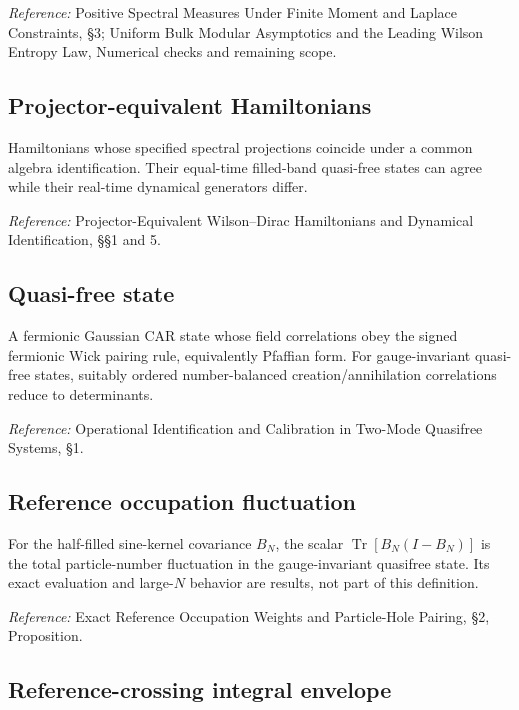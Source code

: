 \documentclass[
  10pt,
  a4paper,
]{article}
\begin{document}
\nopagebreak[4]

\emph{Reference:} Positive Spectral Measures Under Finite Moment and Laplace Constraints, §3; Uniform Bulk Modular Asymptotics and the Leading Wilson Entropy Law, Numerical checks and remaining scope.

\subsection{Projector-equivalent Hamiltonians}\label{projector-equivalent-hamiltonians}

Hamiltonians whose specified spectral projections coincide under a common algebra identification. Their equal-time filled-band quasi-free states can agree while their real-time dynamical generators differ.

\nopagebreak[4]

\emph{Reference:} Projector-Equivalent Wilson--Dirac Hamiltonians and Dynamical Identification, §§1 and 5.

\subsection{Quasi-free state}\label{quasi-free-state}

A fermionic Gaussian CAR state whose field correlations obey the signed fermionic Wick pairing rule, equivalently Pfaffian form. For gauge-invariant quasi-free states, suitably ordered number-balanced creation/annihilation correlations reduce to determinants.

\nopagebreak[4]

\emph{Reference:} Operational Identification and Calibration in Two-Mode Quasifree Systems, §1.

\subsection{Reference occupation fluctuation}\label{reference-occupation-fluctuation}

For the half-filled sine-kernel covariance \(B_N\), the scalar \(\operatorname{Tr}[B_N(I-B_N)]\) is the total particle-number fluctuation in the gauge-invariant quasifree state. Its exact evaluation and large-\(N\) behavior are results, not part of this definition.

\nopagebreak[4]

\emph{Reference:} Exact Reference Occupation Weights and Particle-Hole Pairing, §2, Proposition.

\subsection{Reference-crossing integral envelope}\label{reference-crossing-integral-envelope}
\end{document}
